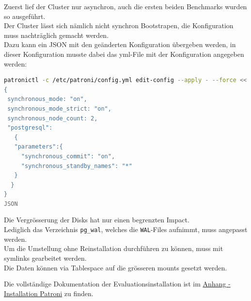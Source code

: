 \begin{flushleft}
    Zuerst lief der Cluster nur asynchron, auch die ersten beiden Benchmarks wurden so ausgeführt.\\
    Der Cluster lässt sich nämlich nicht synchron Bootstrapen, die Konfiguration muss nachträglich gemacht werden.\\
    Dazu kann ein JSON mit den geänderten Konfiguration übergeben werden, in dieser Konfiguration musste dabei das yml-File mit der Konfiguration angegeben werden:
\lstset{style=gra_codestyle}
\begin{lstlisting}[language=bash, caption=Patroni - Synchrone Replikation setzen,captionpos=b,label={lst:patroni_set_sync_replication},breaklines=true]
patronictl -c /etc/patroni/config.yml edit-config --apply - --force <<'JSON'
{
 synchronous_mode: "on",
 synchronous_mode_strict: "on",
 synchronous_node_count: 2,
 "postgresql":
   {
   "parameters":{
     "synchronous_commit": "on",
     "synchronous_standby_names": "*"
   }
  }
}
JSON
\end{lstlisting}
\end{flushleft}
\clearpage
{}
\recalctypearea
\begin{flushleft}
    Die Vergrösserung der Disks hat nur einen begrenzten Impact.\\
    Lediglich das Verzeichnis \texttt{pg\_wal}, welches die \texttt{WAL}-Files aufnimmt, muss angepasst werden.\\
    Um die Umstellung ohne Reinstallation durchführen zu können, muss mit symlinks gearbeitet werden.\\
    Die Daten können via Tablespace auf die grösseren mounts gesetzt werden.\\
\end{flushleft}
\clearpage
{}
\recalctypearea
\begin{flushleft}
    Die vollständige Dokumentation der Evaluationsinstallation ist im \hyperref[subsec:evaluation_installation_patroni]{Anhang - Installation Patroni} zu finden.
\end{flushleft}